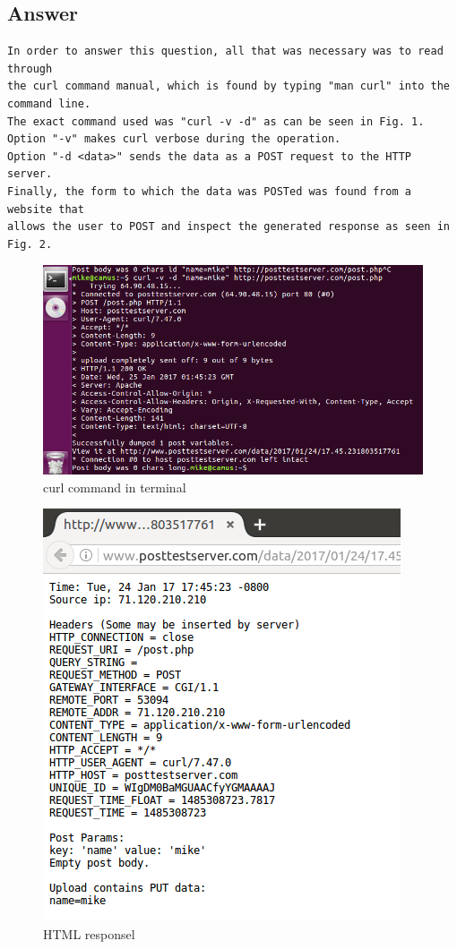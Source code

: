 \documentclass{article}
\begin{document}
\subsection*{Answer}


\begin{verbatim}
In order to answer this question, all that was necessary was to read through 
the curl command manual, which is found by typing "man curl" into the command line.
The exact command used was "curl -v -d" as can be seen in Fig. 1.
Option "-v" makes curl verbose during the operation.
Option "-d <data>" sends the data as a POST request to the HTTP server.
Finally, the form to which the data was POSTed was found from a website that 
allows the user to POST and inspect the generated response as seen in Fig. 2. 

\end{verbatim}

\begin{figure}[ht!]
\centering
\includegraphics[width=\linewidth]{curl.png}
\caption{curl command in terminal \label{overflow}}
\end{figure}

\newpage

\begin{center}
\begin{figure}[ht!]
\centering
\includegraphics[width=300 px]{HTMLresponse.png}
\caption{HTML responsel \label{overflow}}
\end{figure}
\end{center}
\end{document}
